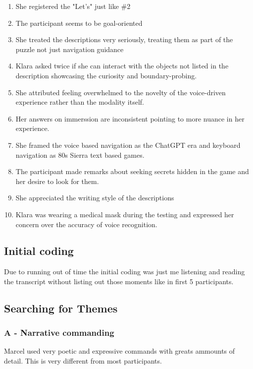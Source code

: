 \begin{enumerate}
    \item She registered the "Let's" just like \#2
    \item The participant seems to be goal-oriented
    \item She treated the descriptions very seriously, treating them as part of the puzzle not just navigation guidance
    \item Klara asked twice if she can interact with the objects not listed in the description showcasing the curiosity and boundary-probing.
    \item She attributed feeling overwhelmed to the novelty of the voice-driven experience rather than the modality itself.
    \item Her answers on immerssion are inconsistent pointing to more nuance in her experience.
    \item She framed the voice based navigation as the ChatGPT era and keyboard navigation as 80s Sierra text based games. 
    \item The participant made remarks about seeking secrets hidden in the game and her desire to look for them.
    \item She appreciated the writing style of the descriptions 
    \item Klara was wearing a medical mask during the testing and expressed her concern over the accuracy of voice recognition.
 
    
\end{enumerate}

\subsection{Initial coding}

Due to running out of time the initial coding was just me listening and reading the transcript without listing out those moments like in first 5 participants. 
         


\subsection{Searching for Themes}

\subsubsection{A - Narrative commanding}
Marcel used very poetic and expressive commands with greats ammounts of detail. This is very different from most participants.


